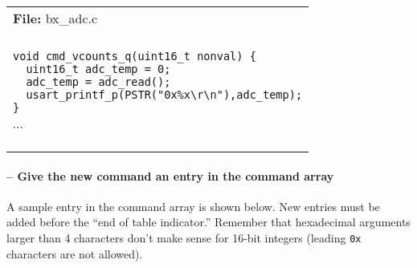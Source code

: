 \begin{center}
  \vspace{-\baselineskip}
  \begin{tabular}{|l|} \hline
    \rowcolor[gray]{0.8}
    \begin{minipage}[c]{\textwidth - 2\tabcolsep}
      \textbf{File:}
      bx\_adc.c
    \end{minipage}\\
    \begin{minipage}[c]{\textwidth - 2\tabcolsep}
      \vspace{0.5\baselineskip}
      $\cdots$ \\
      \begin{minipage}[c]{\textwidth - 2\tabcolsep}
        \lstset{language=c}
        \begin{lstlisting}
void cmd_vcounts_q(uint16_t nonval) {
  uint16_t adc_temp = 0;
  adc_temp = adc_read();
  usart_printf_p(PSTR("0x%x\r\n"),adc_temp);
}
        \end{lstlisting}
      \end{minipage}
      $\cdots$\\
      \vspace{-0.5\baselineskip}
    \end{minipage}\\
    \hline
  \end{tabular}
\end{center}


\addtocounter{comcount}{1}
\paragraph{ -- Give the new command an entry in the command array}
A sample entry in the command array is shown below.  New entries must
be added before the ``end of table indicator.'' Remember that
hexadecimal arguments larger than 4 characters don't make sense for
16-bit integers (leading \texttt{0x} characters are not allowed).

